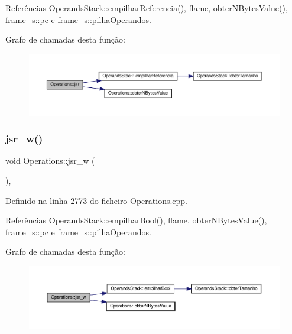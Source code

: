Referências Operands\+Stack\+::empilhar\+Referencia(), flame, obter\+N\+Bytes\+Value(), frame\+\_\+s\+::pc e frame\+\_\+s\+::pilha\+Operandos.

Grafo de chamadas desta função\+:
\nopagebreak
\begin{figure}[H]
\begin{center}
\leavevmode
\includegraphics[width=350pt]{classOperations_a63c3ab8fef60a8a19ee336cb3d86f9aa_cgraph}
\end{center}
\end{figure}
\mbox{\label{classOperations_a22241dabd3678c4ab77bbe5882c3a4db}} 
\subsubsection{\texorpdfstring{jsr\+\_\+w()}{jsr\_w()}}
{\footnotesize\ttfamily void Operations\+::jsr\+\_\+w (\begin{DoxyParamCaption}{ }\end{DoxyParamCaption})\hspace{0.3cm}{\ttfamily [static]}, {\ttfamily [private]}}



Definido na linha 2773 do ficheiro Operations.\+cpp.



Referências Operands\+Stack\+::empilhar\+Bool(), flame, obter\+N\+Bytes\+Value(), frame\+\_\+s\+::pc e frame\+\_\+s\+::pilha\+Operandos.

Grafo de chamadas desta função\+:
\nopagebreak
\begin{figure}[H]
\begin{center}
\leavevmode
\includegraphics[width=350pt]{classOperations_a22241dabd3678c4ab77bbe5882c3a4db_cgraph}
\end{center}
\end{figure}
\mbox{\label{classOperations_aab1532a2f22ab943a1ec37e33ae742b3}} 
